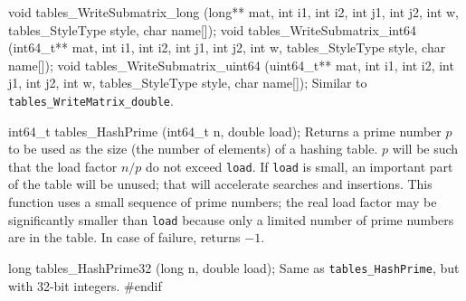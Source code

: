 void tables_WriteSubmatrix_long (long** mat, int i1, int i2, int j1, int j2, 
                                 int w, tables_StyleType style, char name[]);
void tables_WriteSubmatrix_int64 (int64_t** mat, int i1, int i2, int j1, int j2,
                                  int w, tables_StyleType style, char name[]);
void tables_WriteSubmatrix_uint64 (uint64_t** mat, int i1, int i2, int j1, 
                           int j2, int w, tables_StyleType style, char name[]);
\endcode
 \tab Similar to {\tt tables\_WriteMatrix\_double}.
 \endtab
\code

int64_t tables_HashPrime (int64_t n, double load);
\endcode
  \tab Returns a prime number $p$ to be used as the size 
   (the number of elements) of a hashing table.
   $p$ will be such that the load factor $n/p$ do not exceed {\tt load}.
   If {\tt load} is small, an important part of the table will be unused; that
   will accelerate searches and insertions.
   This function uses a small sequence of prime numbers; the real load factor
   may be significantly smaller than {\tt load} because only a limited
   number of prime numbers are in the table. In case of failure, returns $-1$.
 \endtab
\code

long tables_HashPrime32 (long n, double load);
\endcode
  \tab Same as \texttt{tables\_HashPrime}, but with 32-bit integers.
 \endtab
\code\hide
#endif
\endhide
\endcode
